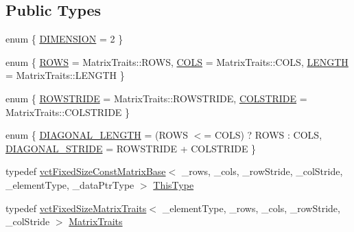 \subsection*{Public Types}
\begin{DoxyCompactItemize}
\item 
enum \{ \hyperlink{classvct_fixed_size_const_matrix_base_ab96748397b9d0700e8c892b7700c29b3a8f93683e9a4da14eb3a7005b19ad135f}{D\+I\+M\+E\+N\+S\+I\+O\+N} = 2
 \}
\item 
enum \{ \hyperlink{classvct_fixed_size_const_matrix_base_a05da4a844e1880e31d3052abb9a8063ba628eeb65016492a84b40dad539262735}{R\+O\+W\+S} = Matrix\+Traits\+:\+:R\+O\+W\+S, 
\hyperlink{classvct_fixed_size_const_matrix_base_a05da4a844e1880e31d3052abb9a8063ba99583531bd0415ad92eed81fc931d592}{C\+O\+L\+S} = Matrix\+Traits\+:\+:C\+O\+L\+S, 
\hyperlink{classvct_fixed_size_const_matrix_base_a05da4a844e1880e31d3052abb9a8063ba3a9b8b3d119455a4b5f4a6553a707f92}{L\+E\+N\+G\+T\+H} = Matrix\+Traits\+:\+:L\+E\+N\+G\+T\+H
 \}
\item 
enum \{ \hyperlink{classvct_fixed_size_const_matrix_base_a0aa9b864b8810dd6a50640c965564bd0a1249f054e777d0972eee94e9e33c3f4f}{R\+O\+W\+S\+T\+R\+I\+D\+E} = Matrix\+Traits\+:\+:R\+O\+W\+S\+T\+R\+I\+D\+E, 
\hyperlink{classvct_fixed_size_const_matrix_base_a0aa9b864b8810dd6a50640c965564bd0aee4513ad3dee685fdda1bc2c264be993}{C\+O\+L\+S\+T\+R\+I\+D\+E} = Matrix\+Traits\+:\+:C\+O\+L\+S\+T\+R\+I\+D\+E
 \}
\item 
enum \{ \hyperlink{classvct_fixed_size_const_matrix_base_ad4ad7a7ed23628b65949dbbf56d388f4ab8ef0428d870c5a6319df40288a7f43d}{D\+I\+A\+G\+O\+N\+A\+L\+\_\+\+L\+E\+N\+G\+T\+H} = (R\+O\+W\+S $<$= C\+O\+L\+S) ? R\+O\+W\+S \+: C\+O\+L\+S, 
\hyperlink{classvct_fixed_size_const_matrix_base_ad4ad7a7ed23628b65949dbbf56d388f4aa23755b132b8c416884bd2e751ea69ca}{D\+I\+A\+G\+O\+N\+A\+L\+\_\+\+S\+T\+R\+I\+D\+E} = R\+O\+W\+S\+T\+R\+I\+D\+E + C\+O\+L\+S\+T\+R\+I\+D\+E
 \}
\item 
typedef \hyperlink{classvct_fixed_size_const_matrix_base}{vct\+Fixed\+Size\+Const\+Matrix\+Base}$<$ \+\_\+rows, \+\_\+cols, \+\_\+row\+Stride, \+\_\+col\+Stride, \+\_\+element\+Type, \+\_\+data\+Ptr\+Type $>$ \hyperlink{classvct_fixed_size_const_matrix_base_a7ec66a96ed7e08ce9ff54093133c9d8d}{This\+Type}
\item 
typedef \hyperlink{classvct_fixed_size_matrix_traits}{vct\+Fixed\+Size\+Matrix\+Traits}$<$ \+\_\+element\+Type, \+\_\+rows, \+\_\+cols, \+\_\+row\+Stride, \+\_\+col\+Stride $>$ \hyperlink{classvct_fixed_size_const_matrix_base_a013c7db3c4e38c1573c29ee8ff40016f}{Matrix\+Traits}

\end{DoxyCompactItemize}
